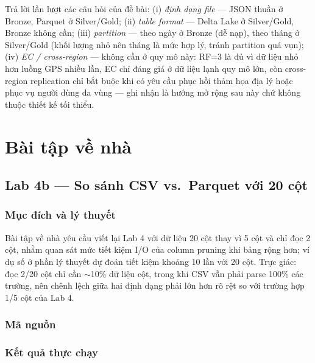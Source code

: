 \documentclass[12pt,a4paper,oneside]{article}
\begin{document}
Trả lời lần lượt các câu hỏi của đề bài: (i) \emph{định dạng file} --- JSON thuần ở Bronze, Parquet ở Silver/Gold; (ii) \emph{table format} --- Delta Lake ở Silver/Gold, Bronze không cần; (iii) \emph{partition} --- theo ngày ở Bronze (dễ nạp), theo tháng ở Silver/Gold (khối lượng nhỏ nên tháng là mức hợp lý, tránh partition quá vụn); (iv) \emph{EC / cross-region} --- không cần ở quy mô này: RF=3 là đủ vì dữ liệu nhỏ hơn luồng GPS nhiều lần, EC chỉ đáng giá ở dữ liệu lạnh quy mô lớn, còn cross-region replication chỉ bắt buộc khi có yêu cầu phục hồi thảm họa địa lý hoặc phục vụ người dùng đa vùng --- ghi nhận là hướng mở rộng sau này chứ không thuộc thiết kế tối thiểu.

\section{Bài tập về nhà}
\label{sec:homework}

\subsection{Lab 4b --- So sánh CSV vs.\ Parquet với 20 cột}

\subsubsection{Mục đích và lý thuyết}

Bài tập về nhà yêu cầu viết lại Lab 4 với dữ liệu 20 cột thay vì 5 cột và chỉ đọc 2 cột, nhằm quan sát mức tiết kiệm I/O của column pruning khi bảng rộng hơn; ví dụ số ở phần lý thuyết dự đoán tiết kiệm khoảng 10 lần với 20 cột. Trực giác: đọc 2/20 cột chỉ cần $\sim$10\% dữ liệu cột, trong khi CSV vẫn phải parse 100\% các trường, nên chênh lệch giữa hai định dạng phải lớn hơn rõ rệt so với trường hợp 1/5 cột của Lab 4.

\subsubsection{Mã nguồn}



\subsubsection{Kết quả thực chạy}
\end{document}
